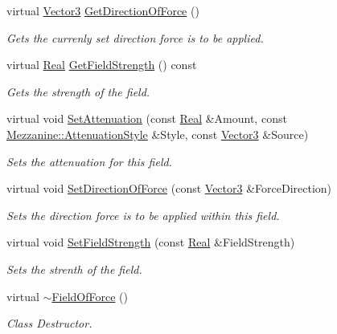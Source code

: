 \begin{DoxyCompactItemize}
virtual \hyperlink{classMezzanine_1_1Vector3}{Vector3} \hyperlink{classMezzanine_1_1FieldOfForce_aa38710cbe67fad1b0be2e0a414d8e55c}{GetDirectionOfForce} ()
\begin{DoxyCompactList}\small\item\em Gets the currenly set direction force is to be applied. \item\end{DoxyCompactList}\item 
virtual \hyperlink{namespaceMezzanine_a726731b1a7df72bf3583e4a97282c6f6}{Real} \hyperlink{classMezzanine_1_1FieldOfForce_ae8071fe3ad4397b57cff5f3816d72e02}{GetFieldStrength} () const 
\begin{DoxyCompactList}\small\item\em Gets the strength of the field. \item\end{DoxyCompactList}\item 
virtual void \hyperlink{classMezzanine_1_1FieldOfForce_aa2ba435821f4abc4c59b0ca99f077759}{SetAttenuation} (const \hyperlink{namespaceMezzanine_a726731b1a7df72bf3583e4a97282c6f6}{Real} \&Amount, const \hyperlink{namespaceMezzanine_a2d10a79e11a2031df10af540eede12fa}{Mezzanine::AttenuationStyle} \&Style, const \hyperlink{classMezzanine_1_1Vector3}{Vector3} \&Source)
\begin{DoxyCompactList}\small\item\em Sets the attenuation for this field. \item\end{DoxyCompactList}\item 
virtual void \hyperlink{classMezzanine_1_1FieldOfForce_aaa4df06c275221b2b7c313a7d45ec71a}{SetDirectionOfForce} (const \hyperlink{classMezzanine_1_1Vector3}{Vector3} \&ForceDirection)
\begin{DoxyCompactList}\small\item\em Sets the direction force is to be applied within this field. \item\end{DoxyCompactList}\item 
virtual void \hyperlink{classMezzanine_1_1FieldOfForce_abef745957f95ac58f756d84f00fbf549}{SetFieldStrength} (const \hyperlink{namespaceMezzanine_a726731b1a7df72bf3583e4a97282c6f6}{Real} \&FieldStrength)
\begin{DoxyCompactList}\small\item\em Sets the strenth of the field. \item\end{DoxyCompactList}\item 
\hypertarget{classMezzanine_1_1FieldOfForce_ae9d68bc47f8598fd764b4ed9ae28a89c}{
virtual \hyperlink{classMezzanine_1_1FieldOfForce_ae9d68bc47f8598fd764b4ed9ae28a89c}{$\sim$FieldOfForce} ()}
\label{classMezzanine_1_1FieldOfForce_ae9d68bc47f8598fd764b4ed9ae28a89c}

\begin{DoxyCompactList}\small\item\em Class Destructor. \item\end{DoxyCompactList}\end{DoxyCompactItemize}
